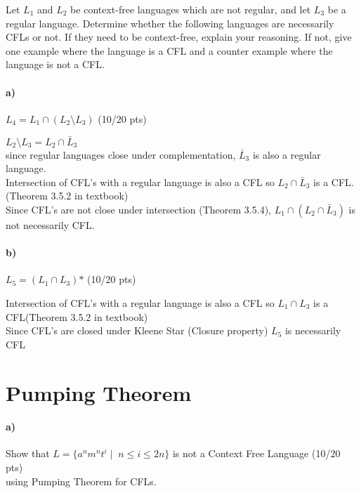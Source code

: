 \documentclass[a4paper,12pt]{article}
\begin{document}
Let $L_1$ and $L_2$ be context-free languages which are not regular, and let $L_3$ be a regular language. Determine whether the following languages are necessarily CFLs or not. If they need to be context-free, explain your reasoning. If not, give one example where the language is a CFL and a counter example where the language is not a CFL. \\

\paragraph{a)} $L_4 = L_1 \cap (L_2 \setminus L_3)$ \hfill \small{(10/20 pts)} \\

\begin{tcolorbox}
$L_2  \setminus L_3 = L_2 \cap \bar L_3$ \\
since regular languages close under complementation, $\bar L_3$ is also a regular language.\\
Intersection of CFL's with a regular language is also a CFL so $L_2\cap \bar L_3$ is a CFL.(Theorem 3.5.2 in textbook) \\
Since CFL's are not close under intersection (Theorem 3.5.4), $L_1 \cap ( L_2 \cap \bar L_3)$ is not necessarily CFL. \\
\end{tcolorbox}

\paragraph{b)} $L_5 = (L_1 \cap L_3)\text{*}$ \hfill \small{(10/20 pts)} \\

\begin{tcolorbox}
Intersection of CFL's with a regular language is also a CFL so $ L_1 \cap L_3 $ is a CFL(Theorem 3.5.2 in textbook) \\
Since CFL's are closed under Kleene Star (Closure property) $L_5$ is necessarily CFL \\

\end{tcolorbox}





\newpage
\section{Pumping Theorem \hfill {}}

\paragraph{a)} Show that $L=\{a^n m^n t^i \mid \; n\leq i \leq 2n\}$ is not a Context Free Language \hfill \small{(10/20 pts)} \\
using Pumping Theorem for CFLs. \\
\end{document}
